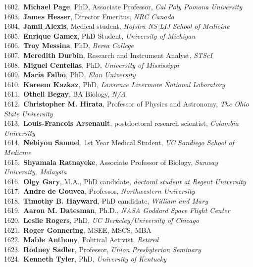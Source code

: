 1602.~{\bf Michael Page}, PhD, Associate Professor, {\sl Cal Poly Pomona University} \\
1603.~{\bf James Hesser}, Director Emeritus, {\sl NRC Canada} \\
1604.~{\bf Jamil Alexis}, Medical student, {\sl Hofstra NS-LIJ School of Medicine } \\
1605.~{\bf Enrique Gamez}, PhD Student, {\sl University of Michigan} \\
1606.~{\bf Troy Messina}, PhD, {\sl Berea College} \\
1607.~{\bf Meredith Durbin}, Research and Instrument Analyst, {\sl STScI} \\
1608.~{\bf Miguel Centellas}, PhD, {\sl University of Mississippi } \\
1609.~{\bf Maria Falbo}, PhD, {\sl Elon University} \\
1610.~{\bf Kareem Kazkaz}, PhD, {\sl Lawrence Livermore National Laboratory} \\
1611.~{\bf Othell Begay}, BA Biology, {\sl N/A} \\
1612.~{\bf Christopher M. Hirata}, Professor of Physics and Astronomy, {\sl The Ohio State University} \\
1613.~{\bf Louis-Francois Arsenault}, postdoctoral research scientist, {\sl Columbia University} \\
1614.~{\bf Nebiyou Samuel}, 1st Year Medical Student, {\sl UC Sandiego School of Medicine} \\
1615.~{\bf Shyamala Ratnayeke}, Associate Professor of Biology, {\sl Sunway University, Malaysia} \\
1616.~{\bf Olgy Gary}, M.A., PhD candidate, {\sl doctoral student at Regent University} \\
1617.~{\bf Andre de Gouvea}, Professor, {\sl Northwestern University} \\
1618.~{\bf Timothy B. Hayward}, PhD candidate, {\sl William and Mary} \\
1619.~{\bf Aaron M. Datesman}, Ph.D., {\sl NASA Goddard Space Flight Center} \\
1620.~{\bf Leslie Rogers}, PhD, {\sl UC Berkeley/University of Chicago} \\
1621.~{\bf Roger Gonnering}, MSEE, MSCS, MBA \\
1622.~{\bf Mable Anthony}, Political Activist, {\sl Retired} \\
1623.~{\bf Rodney Sadler}, Professor, {\sl Union Presbyterian Seminary} \\
1624.~{\bf Kenneth Tyler}, PhD, {\sl University of Kentucky } \\
